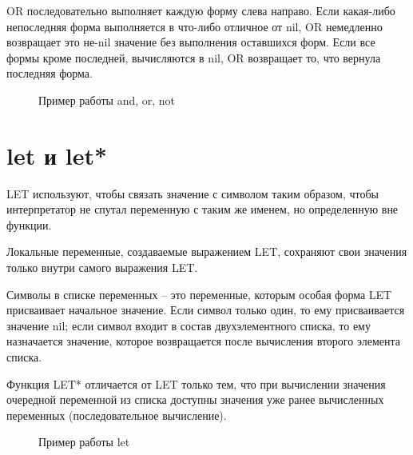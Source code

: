 OR последовательно выполняет каждую форму слева направо. Если 
какая-либо непоследняя форма выполняется в что-либо отличное от nil, 
OR немедленно возвращает это не-nil значение без выполнения 
оставшихся форм. Если все формы кроме последней, вычисляются в nil, 
OR возвращает то, что вернула последняя форма. 

\begin{figure}[H]
    \begin{listingbox}{}
        
    \end{listingbox}
    \caption{Пример работы and, or, not}
    \label{lst:and-or-not-example}
\end{figure}

\section{let и let*}

LET используют, чтобы связать значение с символом таким образом, 
чтобы интерпретатор не спутал переменную с таким же именем, 
но определенную вне функции. 

Локальные переменные, создаваемые выражением LET, сохраняют свои 
значения только внутри самого выражения LET.

Символы в списке переменных -- это переменные, которым особая форма 
LET присваивает начальное значение. Если символ только один, то 
ему присваивается значение nil; если символ входит в состав 
двухэлементного списка, то ему назначается значение, которое 
возвращается после вычисления второго элемента списка.

Функция LET* отличается от LET только тем, что при вычислении 
значения очередной переменной из списка доступны значения уже ранее 
вычисленных переменных (последовательное вычисление).

\begin{figure}[H]
    \begin{listingbox}{}
        
    \end{listingbox}
    \caption{Пример работы let}
    \label{lst:let-example}
\end{figure}